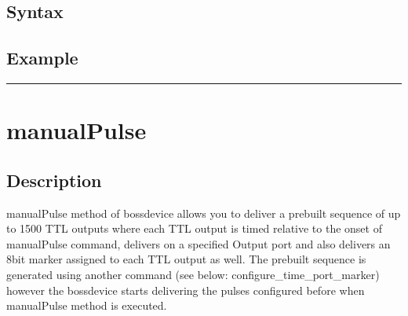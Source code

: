\documentclass[letterpaper,10pt,english]{sphinxmanual}
\begin{document}
\subsection{Syntax}
\label{\detokenize{4_api_documentation:id2}}
\begin{sphinxVerbatim}[commandchars=\\\{\}]
\PYG{p}{[}\PYG{p}{]}
\end{sphinxVerbatim}


\subsection{Example}
\label{\detokenize{4_api_documentation:id3}}
\begin{sphinxVerbatim}[commandchars=\\\{\}]
\end{sphinxVerbatim}


\bigskip\hrule\bigskip



\section{manualPulse}
\label{\detokenize{4_api_documentation:manualpulse}}

\subsection{Description}
\label{\detokenize{4_api_documentation:id4}}
\sphinxAtStartPar
manualPulse method of bossdevice allows you to deliver a pre\sphinxhyphen{}built sequence of up to 1500 TTL outputs where each TTL output is timed relative to the onset of manualPulse command, delivers on a specified Output port and also delivers an 8\sphinxhyphen{}bit marker assigned to each TTL output as well.
The pre\sphinxhyphen{}built sequence is generated using another command (see below: configure\_time\_port\_marker) however the bossdevice starts delivering the pulses configured before when manualPulse method is executed.
\end{document}
